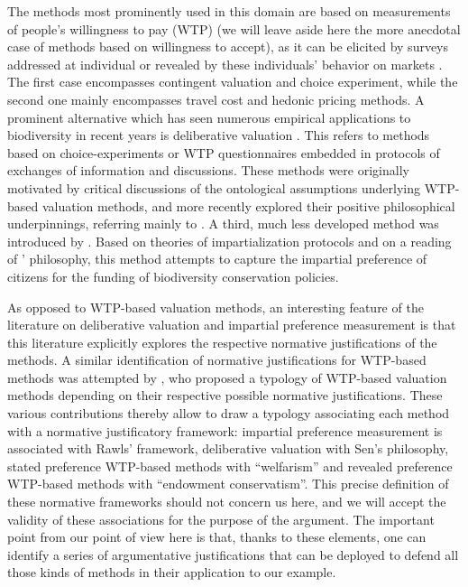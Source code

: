 \documentclass[preprint, french, english, 11pt, authoryear]{elsarticle}%
\begin{document}
The methods most prominently used in this domain are based on measurements of people's willingness to pay (WTP) (we will leave aside here the more anecdotal case of methods based on willingness to accept), as it can be elicited by surveys addressed at individual or revealed by these individuals' behavior on markets \citep{meinard_ethical_2016}. The first case encompasses contingent valuation and choice experiment, while the second one mainly encompasses travel cost and hedonic pricing methods. A prominent alternative which has seen numerous empirical applications to biodiversity in recent years is deliberative valuation \citep{bartkowski_economic_2017}. This refers to methods based on choice-experiments or WTP questionnaires embedded in protocols of exchanges of information and discussions. These methods were originally motivated by critical discussions of the ontological assumptions underlying WTP-based valuation methods, and more recently \citep{bartkowski_beyond_2018} explored their positive philosophical underpinnings, referring mainly to \citep{sen_idea_2009}. A third, much less developed method was introduced by \citep{meinard_measuring_2017}. Based on theories of impartialization \citep{kolm_macrojustice:_2004} protocols and on a reading of \citep{rawls_theory_1999}' philosophy, this method attempts to capture the impartial preference of citizens for the funding of biodiversity conservation policies.

As opposed to WTP-based valuation methods, an interesting feature of the literature on deliberative valuation and impartial preference measurement is that this literature explicitly explores the respective normative justifications of the methods. A similar identification of normative justifications for WTP-based methods was attempted by \citep{meinard_ethical_2016}, who proposed a typology of WTP-based valuation methods depending on their respective possible normative justifications. These various contributions thereby allow to draw a typology associating each method with a normative justificatory framework: impartial preference measurement is associated with Rawls' framework, deliberative valuation with Sen's philosophy, stated preference WTP-based methods with ``welfarism'' and revealed preference WTP-based methods with ``endowment conservatism''. This precise definition of these normative frameworks should not concern us here, and we will accept the validity of these associations for the purpose of the argument. The important point from our point of view here is that, thanks to these elements, one can identify a series of argumentative justifications that can be deployed to defend all those kinds of methods in their application to our example.
\end{document}

